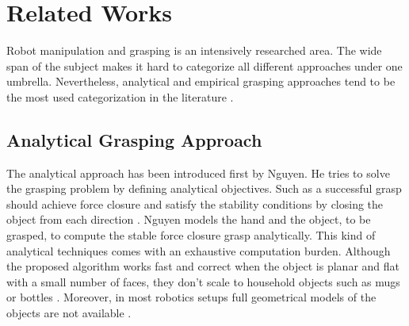 \section{Related Works}


Robot manipulation and grasping is an intensively researched area. The wide span of the subject makes it hard to categorize all different approaches under one umbrella. Nevertheless, analytical and empirical grasping approaches tend to be the most used categorization in the literature \cite{Sahbani2012}.  


\subsection{Analytical Grasping Approach}

The analytical approach has been introduced first by Nguyen. He tries to solve the grasping problem by defining analytical objectives. Such as a successful grasp should achieve force closure and satisfy the stability conditions by closing the object from each direction \cite{Nguyen1987}. Nguyen models the hand and the object, to be grasped, to compute the stable force closure grasp analytically. This kind of analytical techniques comes with an exhaustive computation burden. Although the proposed algorithm works fast and correct when the object is planar and flat with a small number of faces, they don’t scale to household objects such as mugs or bottles \cite{Sahbani2012}. Moreover, in most robotics setups full geometrical models of the objects are not available \cite{Schmidt2018}. 


